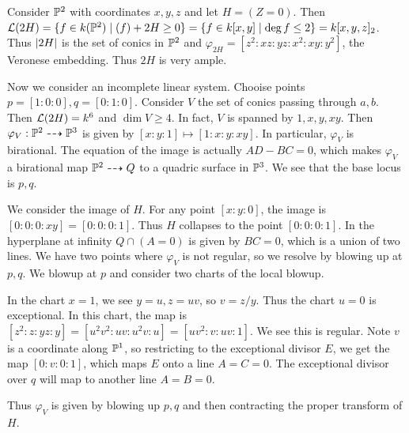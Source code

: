 \documentclass[twoside, 10pt]{article}
\begin{document}
        \begin{exm} Consider $\P^2$ with coordinates $x,y,z$ and let $H =
            (Z=0)$. Then $\mc{L}(2H) = \{f \in k(\P^2) \mid (f) + 2H \geq 0 \}
            = \{f \in k[x,y] \mid \operatorname{deg} f \leq 2 \} = k[x,y,z]_2$.
            Thus $\abs{2H}$ is the set of conics in $\P^2$ and $\varphi_{2H} =
            [z^2:xz:yz:x^2:xy:y^2]$, the Veronese embedding. Thus $2H$ is very
            ample.

            Now we consider an incomplete linear system. Chooise points $p =
            [1:0:0],q = [0:1:0]$. Consider $V$ the set of conics passing
            through $a,b$. Then $\mc{L}(2H) = k^6$ and $\operatorname{dim}V
            \geq 4$. In fact, $V$ is spanned by $1,x,y,xy$. Then $\varphi_V:
            \P^2 \dashrightarrow \P^3$ is given by $[x:y:1] \mapsto
            [1:x:y:xy]$. In particular, $\varphi_V$ is birational. The equation
            of the image is actually $AD-BC = 0$, which makes $\varphi_V$ a
            birational map $\P^2 \dashrightarrow Q$ to a quadric surface in
            $\P^3$. We see that the base locus is $p,q$.

            We consider the image of $H$. For any point $[x:y:0]$, the image is
            $[0:0:0:xy] = [0:0:0:1]$. Thus $H$ collapses to the point
            $[0:0:0:1]$. In the hyperplane at infinity $Q \cap (A = 0)$ is
            given by $BC = 0$, which is a union of two lines. We have two
            points where $\varphi_V$ is not regular, so we resolve by blowing
            up at $p,q$. We blowup at $p$ and consider two charts of the local
            blowup.

            In the chart $x=1$, we see $y=u,z=uv$, so $v = z/y$. Thus the chart
            $u=0$ is exceptional. In this chart, the map is $[z^2:z:yz:y] =
            [u^2v^2:uv:u^2v:u] = [uv^2:v:uv:1]$. We see this is regular. Note
            $v$ is a coordinate along $\P^1$, so restricting to the exceptional
            divisor $E$, we get the map $[0:v:0:1]$, which maps $E$ onto a line
            $A=C=0$. The exceptional divisor over $q$ will map to another line
            $A=B=0$.

            Thus $\varphi_V$ is given by blowing up $p,q$ and then contracting
        the proper transform of $H$.  \end{exm}
\end{document}
